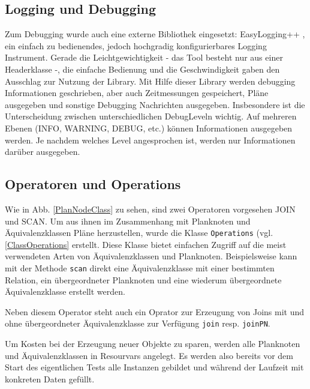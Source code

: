 \subsection{Logging und Debugging}
Zum Debugging wurde auch eine externe Bibliothek eingesetzt: EasyLogging++ \cite{easylogging}, ein einfach zu bedienendes, jedoch hochgradig konfigurierbares Logging Instrument. Gerade die Leichtgewichtigkeit - das Tool besteht nur aus einer Headerklasse -, die einfache Bedienung und die Geschwindigkeit gaben  den Ausschlag zur Nutzung der Library. Mit Hilfe dieser Library werden debugging Informationen geschrieben, aber auch Zeitmessungen gespeichert, Pläne ausgegeben und sonstige Debugging Nachrichten ausgegeben. Insbesondere ist die Unterscheidung zwischen unterschiedlichen Debug\-Leveln wichtig. Auf mehreren Ebenen (INFO, WARNING, DEBUG, etc.) können Informationen ausgegeben werden. Je nachdem welches Level angesprochen ist, werden nur Informationen darüber ausgegeben. 

\subsection{Operatoren und Operations}
Wie in Abb. \ref{PlanNodeClass} zu sehen, sind zwei Operatoren vorgesehen JOIN und SCAN. Um aus ihnen im Zusammenhang mit Planknoten und Äquivalenzklassen Pläne herzustellen, wurde die Klasse \texttt{Operations} (vgl. \ref{ClassOperations} erstellt. Diese Klasse bietet einfachen Zugriff auf die meist verwendeten Arten von Äquivalenzklassen und Planknoten. Beispielsweise kann mit der Methode \texttt{scan} direkt eine Äquivalenzklasse mit einer bestimmten Relation, ein übergeordneter Planknoten und eine wiederum übergeordnete Äquivalenzklasse erstellt werden.

Neben diesem Operator steht auch ein Oprator zur Erzeugung von Joins mit und ohne übergeordneter Äquivalenzklasse zur Verfügung \texttt{join} resp. \texttt{joinPN}.

Um Kosten bei der Erzeugung neuer Objekte zu sparen, werden alle Planknoten und Äquivalenzklassen in Resourvars angelegt. Es werden also bereits vor dem Start des eigentlichen Tests alle Instanzen gebildet und während der Laufzeit mit konkreten Daten gefüllt.

